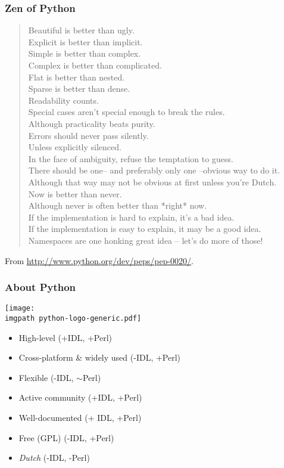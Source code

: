 \documentclass[xetex,10pt]{beamer}
\def\imgpath{../00-img/}
\def\green{\color{green}}
\def\orange{\color{orange}}
\def\red{\color{red}}
\begin{document}
\begin{frame}
	\frametitle{Zen of Python}
	\begin{quote}
Beautiful is better than ugly.\\
Explicit is better than implicit.\\
Simple is better than complex.\\
Complex is better than complicated.\\
Flat is better than nested.\\
Sparse is better than dense.\\
Readability counts.\\
Special cases aren't special enough to break the rules.\\
Although practicality beats purity.\\
Errors should never pass silently.\\
Unless explicitly silenced.\\
    In the face of ambiguity, refuse the temptation to guess.\\
    There should be one-- and preferably only one --obvious way to do it.\\
    Although that way may not be obvious at first unless you're Dutch.\\
    Now is better than never.\\
    Although never is often better than *right* now.\\
    If the implementation is hard to explain, it's a bad idea.\\
    If the implementation is easy to explain, it may be a good idea.\\
    Namespaces are one honking great idea -- let's do more of those!\\
\end{quote}
From \url{http://www.python.org/dev/peps/pep-0020/}.
\end{frame}

\begin{frame}
	\frametitle{About Python}
	\texttt{[image: \\imgpath python-logo-generic.pdf]}
	
	\begin{itemize}
		\item High-level ({\green +IDL}, {\green +Perl})
		\item Cross-platform \& widely used ({\red -IDL}, {\green +Perl})
		\item Flexible ({\red -IDL}, {\orange $\sim$Perl})
		\item Active community ({\green +IDL}, {\green +Perl})
		\item Well-documented ({\green + IDL}, {\green +Perl})
		\item Free (GPL) ({\red -IDL}, {\green +Perl})
		\item \emph{Dutch} ({\red -IDL}, {\red -Perl})
	\end{itemize}
\end{frame}
\end{document}
